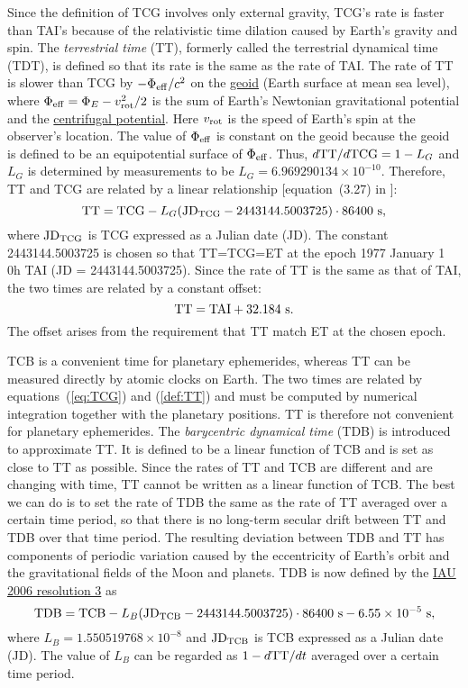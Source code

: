 \documentclass[12pt]{article}
\newcommand \beq {\begin{equation}}
\newcommand \eeq {\end{equation}}
\newcommand{\expl}{\cite{expl}}
\begin{document}
\begin{CJK}{UTF8}{bkai}
Since the definition of TCG involves only external gravity, TCG's rate is {\rm faster} 
than TAI's because of the relativistic time dilation caused by 
Earth's gravity and spin. 
The {\em terrestrial time} (TT), 
formerly called the {\rm terrestrial dynamical time} (TDT), is defined so that its rate 
is the same as the rate of TAI. 
The rate of TT is slower than TCG by $-\Phi_{\rm eff}/c^2$ on the 
\href{https://en.wikipedia.org/wiki/Geoid}{geoid} (Earth surface at mean sea level), 
where $\Phi_{\rm eff}=\Phi_E - v^2_{\rm rot}/2$ is the sum of Earth's Newtonian 
gravitational potential and the 
\href{http://scienceworld.wolfram.com/physics/CentrifugalPotential.html}{centrifugal 
potential}. Here $v_{\rm rot}$ is the speed of Earth's spin at the observer's location. 
The value of $\Phi_{\rm eff}$ 
is constant on the geoid because the geoid is defined to be an equipotential 
surface of $\Phi_{\rm eff}$. Thus, 
$d {\rm TT}/d {\rm TCG} = 1-L_G$ and $L_G$ is determined by measurements to be 
$L_G=6.969290134\times 10^{-10}$. Therefore, TT and TCG are related by a linear 
relationship [equation~(3.27) in \expl ]: 
\beq
  {\rm TT} = {\rm TCG} - L_G ({\rm JD}_{\rm TCG} - 2443144.5003725) \cdot 86400~{\rm s} ,
\label{def:TT}
\eeq
where ${\rm JD_{TCG}}$ is TCG expressed as a Julian date (JD). The 
constant 2443144.5003725 is chosen so that TT=TCG=ET at the epoch 1977 January 1 0h TAI 
(JD = 2443144.5003725). Since the rate of TT is the same as that of TAI, the two 
times are related by a constant offset:
\beq
  {\rm TT} = {\rm TAI} + 32.184~{\rm s} .
\eeq
The offset arises from the requirement that TT match ET at the chosen epoch.

TCB is a convenient time for planetary ephemerides, whereas TT can be measured 
directly by atomic clocks on Earth. The two times are related by equations~(\ref{eq:TCG}) 
and (\ref{def:TT}) and must be computed by numerical integration together with the 
planetary positions. TT is therefore not convenient for planetary ephemerides. 
The {\em barycentric dynamical time} (TDB) is introduced to approximate TT. It is 
defined to be a linear function of TCB and is set as close to TT as possible. Since 
the rates of TT and TCB are different and are changing with time, TT cannot be 
written as a linear function of TCB. The best we can do is to set the rate of 
TDB the same as the rate of TT averaged over a certain time period, so that there 
is no long-term secular drift between TT and TDB over that time period. 
The resulting deviation between TDB and TT 
has components of periodic variation caused by the eccentricity of Earth's orbit and 
the gravitational fields of the Moon and planets. TDB is now defined by the 
\href{https://www.iau.org/static/resolutions/IAU2006_Resol3.pdf}{IAU 2006 resolution 3} 
as
\beq
  {\rm TDB} = {\rm TCB} - L_B ({\rm JD_{TCB}} - 2443144.5003725)\cdot 86400~{\rm s} 
- 6.55\times 10^{-5}~{\rm s} ,
\eeq
where $L_B= 1.550519768\times 10^{-8}$ 
and ${\rm JD_{TCB}}$ is TCB expressed as a Julian date (JD). The value of $L_B$ 
can be regarded as $1-d {\rm TT}/dt$ averaged over a certain time period.


\end{CJK}
\end{document}
